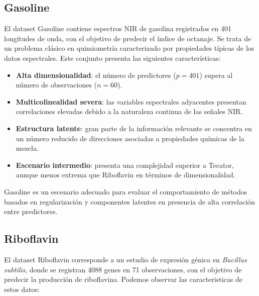 \documentclass[12pt,a4paper]{report}
\begin{document}
\subsection{Gasoline}

El dataset Gasoline contiene espectros NIR de gasolina registrados en 401 longitudes de onda, con el objetivo de predecir el índice de octanaje. Se trata de un problema clásico en quimiometría caracterizado por propiedades típicas de los datos espectrales. Este conjunto presenta las siguientes características:

\begin{itemize}
    \item \textbf{Alta dimensionalidad}: el número de predictores ($p=401$) supera al número de observaciones ($n=60$).

    \item \textbf{Multicolinealidad severa}: las variables espectrales adyacentes presentan correlaciones elevadas debido a la naturaleza continua de las señales NIR.

    \item \textbf{Estructura latente}: gran parte de la información relevante se concentra en un número reducido de direcciones asociadas a propiedades químicas de la mezcla.

    \item \textbf{Escenario intermedio}: presenta una complejidad superior a Tecator, aunque menos extrema que Riboflavin en términos de dimensionalidad.
\end{itemize}

Gasoline es un escenario adecuado para evaluar el comportamiento de métodos basados en regularización y componentes latentes en presencia de alta correlación entre predictores.

\subsection{Riboflavin}

El dataset Riboflavin corresponde a un estudio de expresión génica en \textit{Bacillus subtilis}, donde se registran 4088 genes en 71 observaciones, con el objetivo de predecir la producción de riboflavina. Podemos observar las caracteristicas de estos datos:
\end{document}
